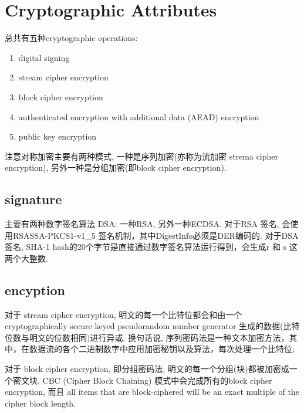\documentclass[a4paper]{ctexart}
\begin{document}
\section{Cryptographic Attributes}
总共有五种cryptographic operations:
\begin{enumerate}
    \kaishu
  \item digital signing
  \item stream cipher encryption
  \item block cipher encryption
  \item authenticated encryption with additional data (AEAD) encryption
  \item public key encryption
\end{enumerate}
注意对称加密主要有两种模式, 一种是序列加密(亦称为流加密 strema cipher encryption), 另外一种是分组加密(即block cipher encryption).





\subsection{signature}
主要有两种数字签名算法 DSA: 一种RSA, 另外一种ECDSA.
对于RSA  签名, 会使用RSASSA-PKCS1-v1\_5 签名机制，其中DigestInfo必须是DER编码的.
对于DSA 签名, SHA-1 hash的20个字节是直接通过数字签名算法运行得到，会生成r 和 s 这两个大整数.

\subsection{encyption}
对于 stream cipher encryption, 明文的每一个比特位都会和由一个cryptographically secure keyed pseudorandom number generator 生成的数据(比特位数与明文的位数相同)进行异或.
换句话说, 序列密码法是一种文本加密方法，其中，在数据流的各个二进制数字中应用加密秘钥以及算法，每次处理一个比特位;

对于 block cipher encryption, 即分组密码法, 明文的每一个分组(块)都被加密成一个密文块. CBC (Cipher Block Chaining) 模式中会完成所有的block cipher encryption, 
而且 all items that are block-ciphered will be an exact multiple of the cipher block length.
\end{document}
